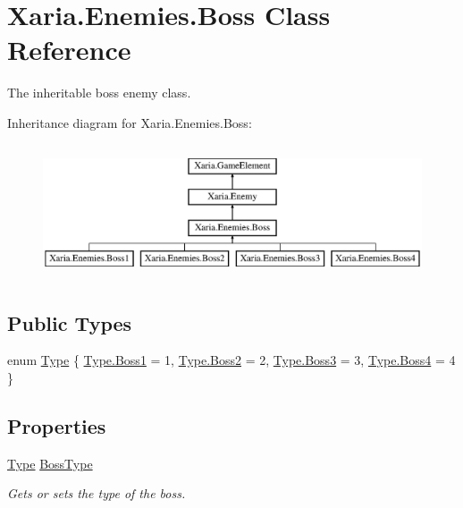 \hypertarget{classXaria_1_1Enemies_1_1Boss}{}\section{Xaria.\+Enemies.\+Boss Class Reference}
\label{classXaria_1_1Enemies_1_1Boss}


The inheritable boss enemy class.  


Inheritance diagram for Xaria.\+Enemies.\+Boss\+:\begin{figure}[H]
\begin{center}
\leavevmode
\includegraphics[height=4.000000cm]{classXaria_1_1Enemies_1_1Boss}
\end{center}
\end{figure}
\subsection*{Public Types}
\begin{DoxyCompactItemize}
\item 
enum \hyperlink{classXaria_1_1Enemies_1_1Boss_ae95ffc3618433440acbfd7aab7671b02}{Type} \{ \hyperlink{classXaria_1_1Enemies_1_1Boss_ae95ffc3618433440acbfd7aab7671b02af3cf3961e7d169c9a89c88a3e0d5d80c}{Type.\+Boss1} = 1, 
\hyperlink{classXaria_1_1Enemies_1_1Boss_ae95ffc3618433440acbfd7aab7671b02ade10f3b430025d072affd5ec149f4992}{Type.\+Boss2} = 2, 
\hyperlink{classXaria_1_1Enemies_1_1Boss_ae95ffc3618433440acbfd7aab7671b02a0030c1b150a03e6973540887027e8204}{Type.\+Boss3} = 3, 
\hyperlink{classXaria_1_1Enemies_1_1Boss_ae95ffc3618433440acbfd7aab7671b02a3490589434cc848e220502f8709474b8}{Type.\+Boss4} = 4
 \}
\end{DoxyCompactItemize}
\subsection*{Properties}
\begin{DoxyCompactItemize}
\item 
\hyperlink{classXaria_1_1Enemies_1_1Boss_ae95ffc3618433440acbfd7aab7671b02}{Type} \hyperlink{classXaria_1_1Enemies_1_1Boss_a8bb0de673324f645e18d2acb686758e7}{Boss\+Type}
\begin{DoxyCompactList}\small\item\em Gets or sets the type of the boss. \end{DoxyCompactList}\end{DoxyCompactItemize}
